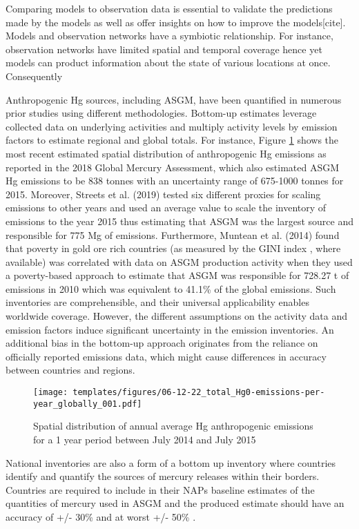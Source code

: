 \begin{flushleft}
Comparing models to observation data is essential to validate the predictions made by the models as well as offer insights on how to improve the models[cite]. Models and observation networks have a symbiotic relationship. For instance, observation networks have limited spatial and temporal coverage hence yet models can product information about the state of various locations at once. Consequently

Anthropogenic Hg sources, including ASGM, have been quantified in numerous prior studies using different methodologies. Bottom-up estimates leverage collected data on underlying activities and multiply activity levels by emission factors to estimate regional and global totals. For instance, Figure \ref{fig:World_Hg_em} shows the most recent estimated spatial distribution of anthropogenic Hg emissions as reported in the 2018 Global Mercury Assessment, which also estimated ASGM Hg emissions to be 838 tonnes with an uncertainty range of 675-1000 tonnes for 2015\cite{united_nations_environment_programme_technical_2019}. Moreover, Streets et al. (2019) tested six different proxies for scaling emissions to other years and used an average value to scale the inventory of emissions to the year 2015 thus estimating that ASGM was the largest source and responsible for 775 Mg of emissions\cite{streets_global_2019}. Furthermore, Muntean et al. (2014) found that poverty in  gold ore rich countries (as measured by the GINI index \cite{sadefo_kamdem_nice_2012}, where available) was correlated with data on ASGM production activity when they used a poverty-based approach to estimate that ASGM was responsible for 728.27 t of emissions in 2010 which was equivalent to 41.1\% of the global emissions\cite{muntean_evaluating_2018}. Such inventories are comprehensible, and their universal applicability enables worldwide coverage. However, the different assumptions on the activity data and emission factors induce significant uncertainty in the emission inventories. An additional bias in the bottom-up approach originates from the reliance on officially reported emissions data, which might cause differences in accuracy between countries and regions.
\begin{figure}[H]
  \texttt{[image: templates/figures/06-12-22\_total\_Hg0-emissions-per-year\_globally\_001.pdf]}
  \centering
  \caption{Spatial distribution of annual average Hg anthropogenic emissions for a 1 year period between July 2014 and July 2015}
  \label{fig:World_Hg_em}
\end{figure}
\FloatBarrier

National inventories are also a form of a bottom up inventory where countries identify and quantify the sources of mercury releases within their borders. Countries are required to include in their NAPs baseline estimates of the quantities of mercury used in ASGM and the produced estimate should have an accuracy of +/- 30\% and at worst +/- 50\% \cite{united_nations_environment_programme_estimating_2017}.
\end{flushleft}
